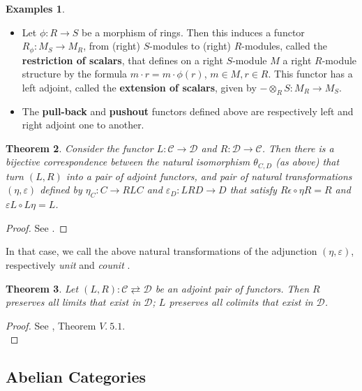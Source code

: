 \documentclass{article}
\theoremstyle{plain}
\newtheorem{theorem}{Theorem}[subsection]
\theoremstyle{definition}
\newtheorem{examples}[theorem]{Examples}
\begin{document}
\begin{examples}
\textbf{ }
    \begin{itemize}
        \item[$a)$] Let $\phi : R \rightarrow S$ be a morphism of rings. Then this induces a functor $R_{\phi} : M_S \rightarrow M_R$, from (right) $S$-modules to (right) $R$-modules, called the \textbf{restriction of scalars}, that defines on a right $S$-module $M$ a right $R$-module structure by the formula $m\cdot r = m\cdot \phi(r)$, $m\in M, r\in R$.
        This functor has a left adjoint, called the \textbf{extension of scalars}, given by 
        $-\otimes_R S :M_R \rightarrow M_S$.
        
        \item[$b)$] The \textbf{pull-back} and \textbf{pushout} functors defined above are respectively left and right adjoint one to another.
    \end{itemize}
\end{examples}

\begin{theorem}
    Consider the functor $L:\mathcal{C}\rightarrow \mathcal{D}$ and $R:\mathcal{D}\rightarrow \mathcal{C}$. 
    Then there is a bijective correspondence between the natural isomorphism $\theta_{C,D}$ (as above) that turn $(L,R)$ into a pair of adjoint functors, and pair of natural transformations $(\eta,\varepsilon)$ defined by 
    $\eta_C: C\rightarrow RLC$ and $\varepsilon_D:LRD\rightarrow D$ that satisfy $R\epsilon\circ\eta R = R$ and $\varepsilon L\circ L\eta=L$.
\end{theorem}
\begin{proof}
    See \cite{McLane_Sau}.
\end{proof}

\noindent In that case, we call the above natural transformations of the adjunction $(\eta,\varepsilon)$, respectively \textit{unit} and \textit{counit} .

\begin{theorem}
    Let $(L,R) : \mathcal{C}\rightleftarrows \mathcal{D}$ be an adjoint pair of functors. Then $R$ preserves all limits that exist in $\mathcal{D}$; $L$ preserves all colimits that exist in $\mathcal{D}$.
\end{theorem}
\begin{proof}
    See \cite{McLane_Sau}, Theorem $V.\:5.1$.\\
\end{proof}

\subsection{Abelian Categories}
\end{document}
